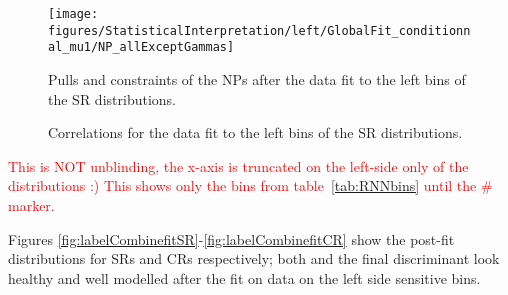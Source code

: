 %
%
%
%

\begin{figure}[ht]
      \centering
      \texttt{[image: figures/StatisticalInterpretation/left/GlobalFit\_conditionnal\_mu1/NP\_allExceptGammas]}
       \caption{Pulls and constraints of the NPs after the data fit to the left bins of the SR distributions.}
       \label{fig:fit_step2_conditional}
\end{figure}


\begin{figure}[b]
  \centering
  \caption{Correlations for the data fit to the left bins of the SR distributions.}
  \label{fig:fit:corrStep2}
\end{figure}



\clearpage

\textcolor{red}{This is NOT unblinding, the x-axis is truncated on the left-side only of the distributions :) 
This shows only the bins from table~\ref{tab:RNNbins} until the \# marker. 
}

Figures \ref{fig:labelCombinefitSR}-\ref{fig:labelCombinefitCR}
show the post-fit distributions for SRs and CRs respectively; both \mjjtag and the final discriminant look healthy 
and well modelled after the fit on data on the left side sensitive bins.

